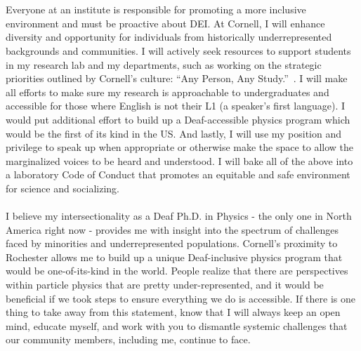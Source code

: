 \documentclass[10pt,a4paper,sans]{moderncv} %
\begin{document}
\\
\\
Everyone at an institute is responsible for promoting a more inclusive environment and must be proactive about DEI. At Cornell, I will enhance diversity and opportunity for individuals from historically underrepresented backgrounds and communities. I will actively seek resources to support students in my research lab and my departments, such as working on the strategic priorities outlined by Cornell's culture: ``Any Person, Any Study.''~\cite{campusplan}. I will make all efforts to make sure my research is approachable to undergraduates and accessible for those where English is not their L1 (a speaker's first language). I would put additional effort to build up a Deaf-accessible physics program which would be the first of its kind in the US. And lastly, I will use my position and privilege to speak up when appropriate or otherwise make the space to allow the marginalized voices to be heard and understood. I will bake all of the above into a laboratory Code of Conduct that promotes an equitable and safe environment for science and socializing.
\\
\\
I believe my intersectionality as a Deaf Ph.D. in Physics - the only one in North America right now - provides me with insight into the spectrum of challenges faced by minorities and underrepresented populations. Cornell's proximity to Rochester allows me to build up a unique Deaf-inclusive physics program that would be one-of-its-kind in the world. People realize that there are perspectives within particle physics that are pretty under-represented, and it would be beneficial if we took steps to ensure everything we do is accessible. If there is one thing to take away from this statement, know that I will always keep an open mind, educate myself, and work with you to dismantle systemic challenges that our community members, including me, continue to face.

\printbibliography
\end{document}
